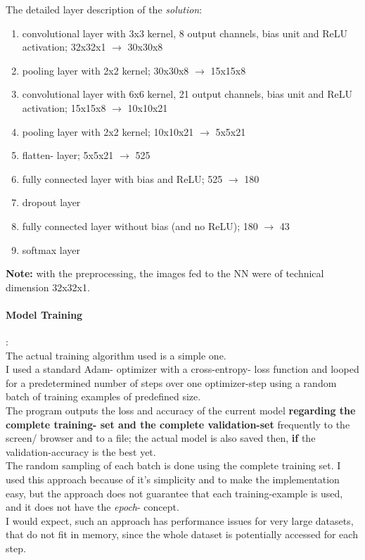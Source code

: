 \documentclass[a4paper]{article}
\begin{document}
The detailed layer description of the \textit{solution}:
\small
\begin{enumerate}
\item convolutional layer with 3x3 kernel, 8 output channels, bias unit and ReLU activation; 32x32x1 $\rightarrow$ 30x30x8
\item pooling layer with 2x2 kernel; 30x30x8 $\rightarrow$ 15x15x8
\item convolutional layer with 6x6 kernel, 21 output channels, bias unit and ReLU activation; 15x15x8 $\rightarrow$ 10x10x21
\item pooling layer with 2x2 kernel; 10x10x21 $\rightarrow$ 5x5x21
\item flatten- layer; 5x5x21 $\rightarrow$ 525
\item fully connected layer with bias and ReLU; 525 $\rightarrow$ 180
\item dropout layer
\item fully connected layer without bias (and no ReLU); 180 $\rightarrow$ 43
\item softmax layer
\end{enumerate}
\normalsize

\textbf{Note:} with the preprocessing, the images fed to the NN were of technical dimension 32x32x1.

\paragraph{Model Training}
:\\
The actual training algorithm used is a simple one.\\
I used a standard Adam- optimizer with a cross-entropy- loss function and looped for a
predetermined number of steps over one optimizer-step using a random batch of training examples
of predefined size.\\
The program outputs the loss and accuracy of the current model \textbf{regarding
the complete training- set and the complete validation-set} frequently
to the screen/ browser and to a file; the actual model is also saved then, \textbf{if}
the validation-accuracy is the best yet.
\\
The random sampling of each batch is done using the complete training set.
I used this approach because of it's simplicity and to make the implementation easy,
but the approach does not guarantee that each training-example is used, and it
does not have the \textit{epoch}- concept.
\\
I would expect, such an approach has performance issues for very large datasets,
that do not fit in memory, since the whole dataset is potentially accessed for
each step.
\end{document}
